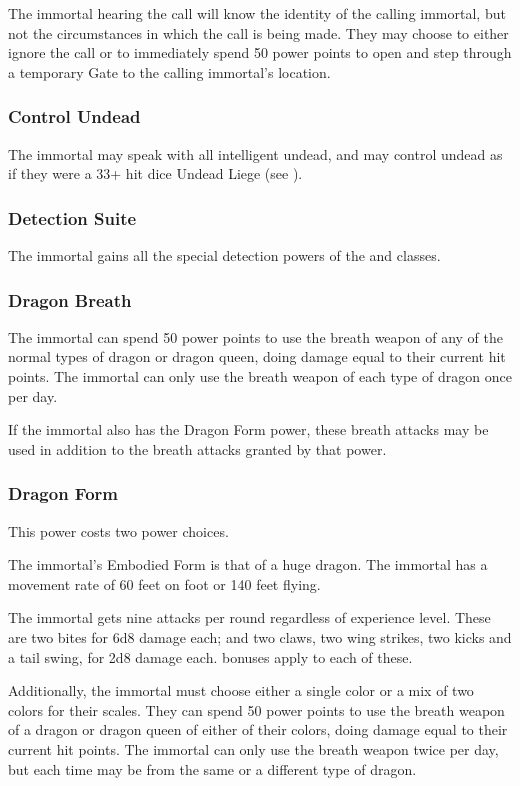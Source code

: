 \begin{multicols*}{2}
The immortal hearing the call will know the identity of the calling immortal, but not the circumstances in which the call is being made. They may choose to either ignore the call or to immediately spend 50 power points to open and step through a temporary Gate to the calling immortal’s location.

\subsubsection{Control Undead}
The immortal may speak with all intelligent undead, and may control undead as if they were a 33+ hit dice Undead Liege (see ).

\subsubsection{Detection Suite}
The immortal gains all the special detection powers of the  and  classes.

\subsubsection{Dragon Breath}
The immortal can spend 50 power points to use the breath weapon of any of the normal types of dragon or dragon queen, doing damage equal to their current hit points. The immortal can only use the breath weapon of each type of dragon once per day.

If the immortal also has the Dragon Form power, these breath attacks may be used in addition to the breath attacks granted by that power.

\subsubsection{Dragon Form}
This power costs two power choices.

The immortal’s Embodied Form is that of a huge dragon. The immortal has a movement rate of 60 feet on foot or 140 feet flying.

The immortal gets nine attacks per round regardless of experience level. These are two bites for 6d8 damage each; and two claws, two wing strikes, two kicks and a tail swing, for 2d8 damage each.  bonuses apply to each of these.

Additionally, the immortal must choose either a single color or a mix of two colors for their scales. They can spend 50 power points to use the breath weapon of a dragon or dragon queen of either of their colors, doing damage equal to their current hit points. The immortal can only use the breath weapon twice per day, but each time may be from the same or a different type of dragon.


\end{multicols*}
